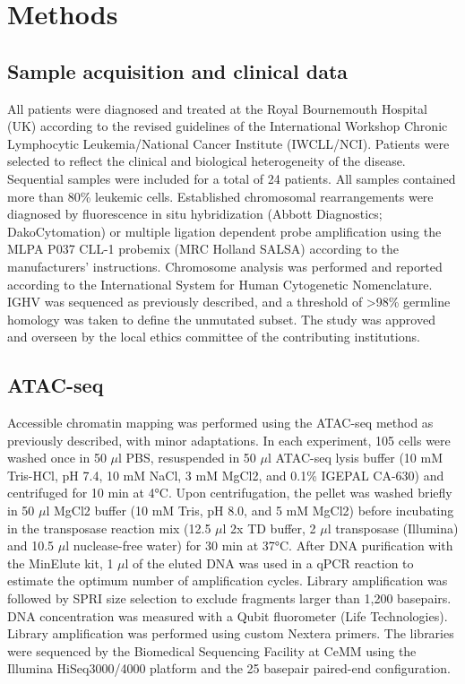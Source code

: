 \documentclass[10pt,]{article}
\begin{document}
\chapter{Methods}\label{methods}

\section{Sample acquisition and clinical
data}\label{sample-acquisition-and-clinical-data}

All patients were diagnosed and treated at the Royal Bournemouth
Hospital (UK) according to the revised guidelines of the International
Workshop Chronic Lymphocytic Leukemia/National Cancer Institute
(IWCLL/NCI). Patients were selected to reflect the clinical and
biological heterogeneity of the disease. Sequential samples were
included for a total of 24 patients. All samples contained more than
80\% leukemic cells. Established chromosomal rearrangements were
diagnosed by fluorescence in situ hybridization (Abbott Diagnostics;
DakoCytomation) or multiple ligation dependent probe amplification using
the MLPA P037 CLL-1 probemix (MRC Holland SALSA) according to the
manufacturers' instructions. Chromosome analysis was performed and
reported according to the International System for Human Cytogenetic
Nomenclature. IGHV was sequenced as previously
described\citep{Hamblin1999}, and a threshold of \textgreater{}98\%
germline homology was taken to define the unmutated
subset\citep{Hamblin1999}. The study was approved and overseen by the
local ethics committee of the contributing institutions.

\section{ATAC-seq}\label{atac-seq}

Accessible chromatin mapping was performed using the ATAC-seq method as
previously described\citep{Buenrostro2013}, with minor adaptations. In
each experiment, 105 cells were washed once in 50 $\mu$l PBS,
resuspended in 50 $\mu$l ATAC-seq lysis buffer (10 mM Tris-HCl, pH 7.4,
10 mM NaCl, 3 mM MgCl2, and 0.1\% IGEPAL CA-630) and centrifuged for 10
min at 4°C. Upon centrifugation, the pellet was washed briefly in 50
$\mu$l MgCl2 buffer (10 mM Tris, pH 8.0, and 5 mM MgCl2) before
incubating in the transposase reaction mix (12.5 $\mu$l 2x TD buffer, 2
$\mu$l transposase (Illumina) and 10.5 $\mu$l nuclease-free water) for
30 min at 37°C. After DNA purification with the MinElute kit, 1 $\mu$l
of the eluted DNA was used in a qPCR reaction to estimate the optimum
number of amplification cycles. Library amplification was followed by
SPRI size selection to exclude fragments larger than 1,200 basepairs.
DNA concentration was measured with a Qubit fluorometer (Life
Technologies). Library amplification was performed using custom Nextera
primers\citep{Buenrostro2013}. The libraries were sequenced by the
Biomedical Sequencing Facility at CeMM using the Illumina HiSeq3000/4000
platform and the 25 basepair paired-end configuration.
\end{document}
